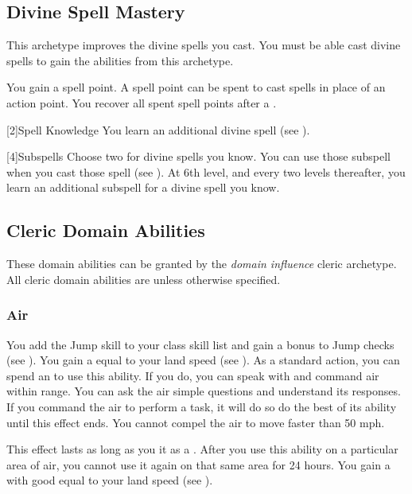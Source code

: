     \subsection{Divine Spell Mastery}
        This archetype improves the divine spells you cast.
        You must be able cast divine spells to gain the abilities from this archetype.

        You gain a spell point.
        A spell point can be spent to cast spells in place of an action point.
        You recover all spent spell points after a .

        [2]{Spell Knowledge}
        You learn an additional divine spell (see ).

        [4]{Subspells}
        Choose two  for divine spells you know.
        You can use those subspell when you cast those spell (see ).
        At 6th level, and every two levels thereafter, you learn an additional subspell for a divine spell you know.

    \subsection{Cleric Domain Abilities}\label{Cleric Domain Abilities}
        These domain abilities can be granted by the \textit{domain influence} cleric archetype.
        All cleric domain abilities are  unless otherwise specified.

        \subsubsection{Air}
             You add the Jump skill to your class skill list and gain a  bonus to Jump checks (see ).
             You gain a  equal to your land speed (see ).
             As a standard action, you can spend an  to use this ability.
            If you do, you can speak with and command air within \rnglong range.
            You can ask the air simple questions and understand its responses.
            If you command the air to perform a task, it will do so do the best of its ability until this effect ends.
            You cannot compel the air to move faster than 50 mph.

            This effect lasts as long as you  it as a .
            After you use this ability on a particular area of air, you cannot use it again on that same area for 24 hours.
             You gain a  with good  equal to your land speed (see ).

